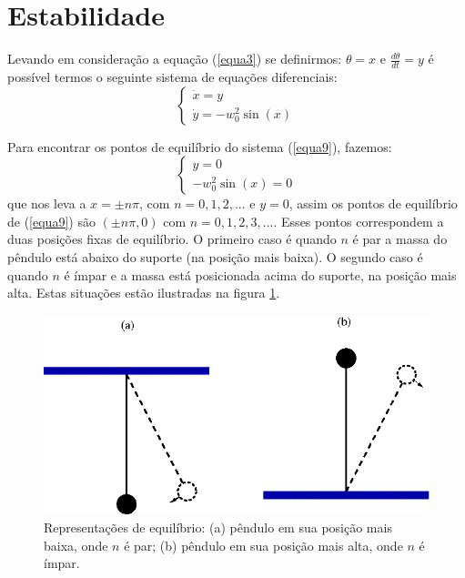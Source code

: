 \documentclass[12pt,openright,twoside,english,brazil]{abntex2}
\begin{document}
\section{Estabilidade}
Levando em consideração a equação (\ref{equa3}) se definirmos: $\theta = x$ e $\frac{d\theta}{dt} = y$ é possível termos o seguinte sistema de equações diferenciais:
\begin{equation}
 \left\{
     \begin{array}{lr}
       \dot{x} = y \\
       \dot{y} = - w_0^2 \sin{(x)}
     \end{array}
     \right.
 \label{equa9}   
\end{equation}

Para encontrar os pontos de equilíbrio do sistema (\ref{equa9}), fazemos:
\begin{equation}
 \left\{
     \begin{array}{lr}
       y = 0 \\
       - w_0^2 \sin{(x)} = 0
     \end{array}
     \right.
 \label{equa10}   
\end{equation}
que nos leva a $x=\pm n \pi$, com $n=0,1,2,...$ e $y=0$, assim os pontos de equilíbrio de (\ref{equa9}) são $ (\pm n \pi,0) $ com $n=0,1,2,3,...$. Esses pontos correspondem a duas posições fixas de equilíbrio. O primeiro caso é quando $n$ é par a massa do pêndulo está abaixo do suporte (na posição mais baixa). O segundo caso é quando $n$ é ímpar e a massa está posicionada acima do suporte, na posição mais alta. Estas situações estão ilustradas na figura \ref{Figura2}.

\begin{figure}[h]
 \begin{center}    
  \includegraphics[scale=0.5]{pendulo-2.png}
 \end{center}
 \caption{Representações de equilíbrio: (a) pêndulo em sua posição mais baixa, onde $n$ é par; (b) pêndulo em sua posição mais alta, onde $n$ é ímpar.}
 \label{Figura2}
\end{figure}
\end{document}
